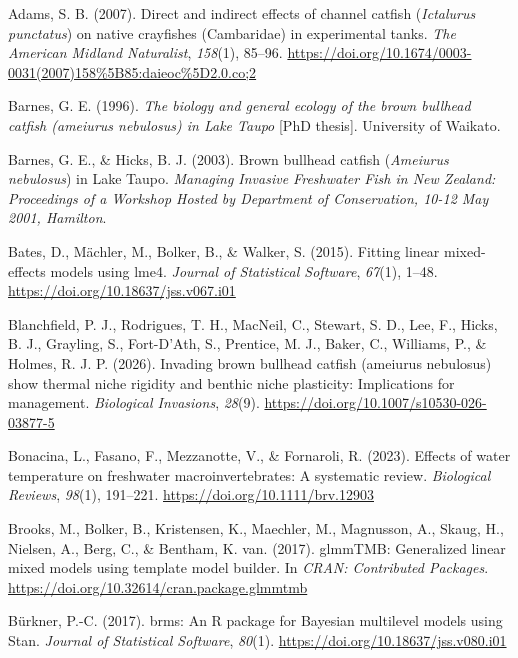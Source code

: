 \documentclass[
  letterpaper,
  DIV=11,
  numbers=noendperiod]{scrartcl}
\newlength{\cslhangindent}
\newenvironment{CSLReferences}[2] %
 {\begin{list}{}{%
  \setlength{\itemindent}{0pt}
  \setlength{\leftmargin}{0pt}
  \setlength{\parsep}{0pt}
  \ifodd #1
   \setlength{\leftmargin}{\cslhangindent}
   \setlength{\itemindent}{-1\cslhangindent}
  \fi
  \setlength{\itemsep}{#2\baselineskip}}}
 {\end{list}}
\begin{document}
\begin{CSLReferences}{1}{0}
Adams, S. B. (2007). Direct and indirect effects of channel catfish
({\emph{Ictalurus punctatus}}) on native crayfishes ({Cambaridae}) in
experimental tanks. \emph{The American Midland Naturalist},
\emph{158}(1), 85--96.
\url{https://doi.org/10.1674/0003-0031(2007)158\%5B85:daieoc\%5D2.0.co;2}

Barnes, G. E. (1996). \emph{The biology and general ecology of the brown
bullhead catfish (\emph{ameiurus nebulosus}) in {Lake Taupo}} {[}PhD
thesis{]}. University of Waikato.

Barnes, G. E., \& Hicks, B. J. (2003). Brown bullhead catfish
({\emph{Ameiurus nebulosus}}) in {Lake Taupo}. \emph{Managing Invasive
Freshwater Fish in {New Zealand}: Proceedings of a Workshop Hosted by
{Department of Conservation}, 10-12 May 2001, {Hamilton}}.

Bates, D., Mächler, M., Bolker, B., \& Walker, S. (2015). Fitting linear
mixed-effects models using {lme4}. \emph{Journal of Statistical
Software}, \emph{67}(1), 1--48.
\url{https://doi.org/10.18637/jss.v067.i01}

Blanchfield, P. J., Rodrigues, T. H., MacNeil, C., Stewart, S. D., Lee,
F., Hicks, B. J., Grayling, S., Fort-D'Ath, S., Prentice, M. J., Baker,
C., Williams, P., \& Holmes, R. J. P. (2026). Invading brown bullhead
catfish (ameiurus nebulosus) show thermal niche rigidity and benthic
niche plasticity: Implications for management. \emph{Biological
Invasions}, \emph{28}(9).
\url{https://doi.org/10.1007/s10530-026-03877-5}

Bonacina, L., Fasano, F., Mezzanotte, V., \& Fornaroli, R. (2023).
Effects of water temperature on freshwater macroinvertebrates: A
systematic review. \emph{Biological Reviews}, \emph{98}(1), 191--221.
\url{https://doi.org/10.1111/brv.12903}

Brooks, M., Bolker, B., Kristensen, K., Maechler, M., Magnusson, A.,
Skaug, H., Nielsen, A., Berg, C., \& Bentham, K. van. (2017). glmmTMB:
Generalized linear mixed models using template model builder. In
\emph{CRAN: Contributed Packages}.
\url{https://doi.org/10.32614/cran.package.glmmtmb}

Bürkner, P.-C. (2017). {brms}: An {R} package for {B}ayesian multilevel
models using {Stan}. \emph{Journal of Statistical Software},
\emph{80}(1). \url{https://doi.org/10.18637/jss.v080.i01}


\end{CSLReferences}
\end{document}
